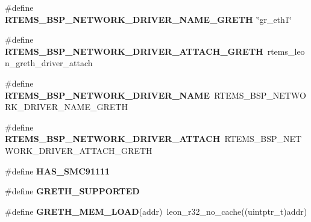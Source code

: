 \begin{DoxyCompactItemize}
\item 
\mbox{\label{group__RTEMSBSPsSPARCLEON3_ga36107bbf2c526a5e101e6e9a7882f183}} 
\#define {\bfseries R\+T\+E\+M\+S\+\_\+\+B\+S\+P\+\_\+\+N\+E\+T\+W\+O\+R\+K\+\_\+\+D\+R\+I\+V\+E\+R\+\_\+\+N\+A\+M\+E\+\_\+\+G\+R\+E\+TH}~\char`\"{}gr\+\_\+eth1\char`\"{}
\item 
\mbox{\label{group__RTEMSBSPsSPARCLEON3_gad539695550b8d0f87fd0479d58e460a7}} 
\#define {\bfseries R\+T\+E\+M\+S\+\_\+\+B\+S\+P\+\_\+\+N\+E\+T\+W\+O\+R\+K\+\_\+\+D\+R\+I\+V\+E\+R\+\_\+\+A\+T\+T\+A\+C\+H\+\_\+\+G\+R\+E\+TH}~rtems\+\_\+leon\+\_\+greth\+\_\+driver\+\_\+attach
\item 
\mbox{\label{group__RTEMSBSPsSPARCLEON3_ga86d4f9aa98431100692e31068070a8df}} 
\#define {\bfseries R\+T\+E\+M\+S\+\_\+\+B\+S\+P\+\_\+\+N\+E\+T\+W\+O\+R\+K\+\_\+\+D\+R\+I\+V\+E\+R\+\_\+\+N\+A\+ME}~R\+T\+E\+M\+S\+\_\+\+B\+S\+P\+\_\+\+N\+E\+T\+W\+O\+R\+K\+\_\+\+D\+R\+I\+V\+E\+R\+\_\+\+N\+A\+M\+E\+\_\+\+G\+R\+E\+TH
\item 
\mbox{\label{group__RTEMSBSPsSPARCLEON3_gadde0d66aef9442971dde465292ac14e6}} 
\#define {\bfseries R\+T\+E\+M\+S\+\_\+\+B\+S\+P\+\_\+\+N\+E\+T\+W\+O\+R\+K\+\_\+\+D\+R\+I\+V\+E\+R\+\_\+\+A\+T\+T\+A\+CH}~R\+T\+E\+M\+S\+\_\+\+B\+S\+P\+\_\+\+N\+E\+T\+W\+O\+R\+K\+\_\+\+D\+R\+I\+V\+E\+R\+\_\+\+A\+T\+T\+A\+C\+H\+\_\+\+G\+R\+E\+TH
\item 
\mbox{\label{group__RTEMSBSPsSPARCLEON3_gaa30c7825a525b11fdad96521928272c2}} 
\#define {\bfseries H\+A\+S\+\_\+\+S\+M\+C91111}
\item 
\mbox{\label{group__RTEMSBSPsSPARCLEON3_gaad194acfc3dec3fd9aee7417387fbed7}} 
\#define {\bfseries G\+R\+E\+T\+H\+\_\+\+S\+U\+P\+P\+O\+R\+T\+ED}
\item 
\mbox{\label{group__RTEMSBSPsSPARCLEON3_ga9189ceb400b0298ec77c9427e6dfe7b1}} 
\#define {\bfseries G\+R\+E\+T\+H\+\_\+\+M\+E\+M\+\_\+\+L\+O\+AD}(addr)~leon\+\_\+r32\+\_\+no\+\_\+cache((uintptr\+\_\+t)addr)
\item 
\mbox{\label{group__RTEMSBSPsSPARCLEON3_ga315fb25d575c3e032fd22487e3ae9663}} 

\end{DoxyCompactItemize}
